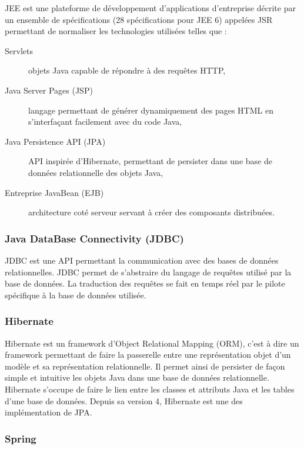 JEE \cite{jee} est une plateforme de développement d'applications d'entreprise décrite par un ensemble de spécifications (28 spécifications pour JEE 6) appelées JSR permettant de normaliser les technologies utilisées telles que :

\begin{description}
	\item[Servlets] objets Java capable de répondre à des requêtes HTTP,
	\item[Java Server Pages (JSP)] langage permettant de générer dynamiquement des pages HTML en s'interfaçant facilement avec du code Java,
	\item[Java Persistence API (JPA)] API inspirée d'Hibernate, permettant de persister dans une base de données relationnelle des objets Java,
	\item[Entreprise JavaBean (EJB)] architecture coté serveur servant à créer des composants distribuées.
\end{description}

\subsubsection{Java DataBase Connectivity (JDBC)}

JDBC \cite{jdbc} est une API permettant la communication avec des bases de données relationnelles. JDBC permet de s'abstraire du langage de requêtes utilisé par la base de données. La traduction des requêtes se fait en temps réel par le pilote spécifique à la base de données utilisée.

\subsubsection{Hibernate}

Hibernate \cite{hibernate} est un framework d'Object Relational Mapping (ORM), c'est à dire un framework permettant de faire la passerelle entre une représentation objet d'un modèle et sa représentation relationnelle. Il permet ainsi de persister de façon simple et intuitive les objets Java dans une base de données relationnelle. Hibernate s'occupe de faire le lien entre les classes et attributs Java et les tables d'une base de données. Depuis sa version 4, Hibernate est une des implémentation de JPA.

\subsubsection{Spring}

